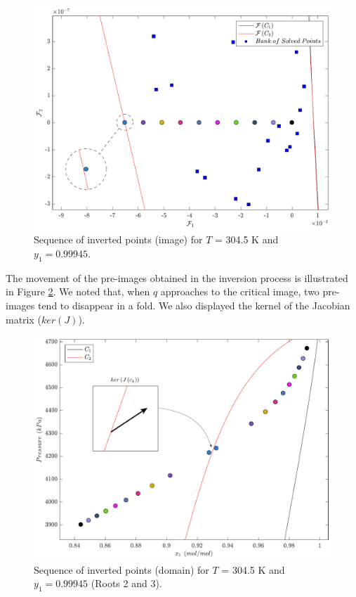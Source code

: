 \documentclass{article}
\theoremstyle{definition}
\theoremstyle{remark}
\begin{document}
\begin{figure}
	\begin{center}
		\includegraphics[scale=0.45]{imagem3.pdf}
		\caption{Sequence of inverted points (image) for $T$ = 304.5 K and $y_1 = 0.99945$.}\label{fig:imagem_S}
	\end{center}
\end{figure}

The movement of the pre-images obtained in the inversion process is illustrated in Figure \ref{fig:domain_S}. We noted that, when $q$ approaches to the critical image, two pre-images tend to disappear in a fold. We also displayed the kernel of the Jacobian matrix ($ker(J)$).


\begin{figure}
	\begin{center}
		\includegraphics[scale=0.50]{dominio3.pdf}
		\caption{Sequence of inverted points (domain) for $T$ = 304.5 K and $y_1 = 0.99945$ (Roots 2 and 3).}\label{fig:domain_S}
	\end{center}
\end{figure}
\end{document}
